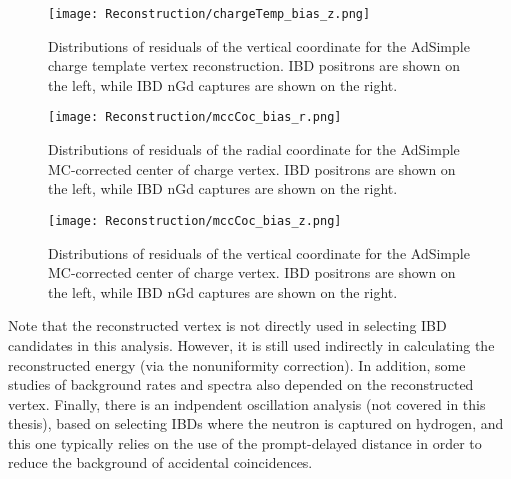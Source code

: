 \documentclass[../thesis.tex]{subfiles}
\begin{document}
\begin{figure}[h]
  \texttt{[image: Reconstruction/chargeTemp\_bias\_z.png]}
  \caption{Distributions of residuals of the vertical coordinate for the AdSimple charge template vertex reconstruction. IBD positrons are shown on the left, while IBD nGd captures are shown on the right.}
  \label{fig:chargeTemp_bias_z}
\end{figure}

\begin{figure}[h]
  \texttt{[image: Reconstruction/mccCoc\_bias\_r.png]}
  \caption{Distributions of residuals of the radial coordinate for the AdSimple MC-corrected center of charge vertex. IBD positrons are shown on the left, while IBD nGd captures are shown on the right.}
  \label{fig:mccCoc_bias_r}
\end{figure}

\begin{figure}[h]
  \texttt{[image: Reconstruction/mccCoc\_bias\_z.png]}
  \caption{Distributions of residuals of the vertical coordinate for the AdSimple MC-corrected center of charge vertex. IBD positrons are shown on the left, while IBD nGd captures are shown on the right.}
  \label{fig:mccCoc_bias_z}
\end{figure}

Note that the reconstructed vertex is not directly used in selecting IBD candidates in this analysis. However, it is still used indirectly in calculating the reconstructed energy (via the nonuniformity correction). In addition, some studies of background rates and spectra also depended on the reconstructed vertex. Finally, there is an indpendent oscillation analysis (not covered in this thesis), based on selecting IBDs where the neutron is captured on hydrogen, and this one typically relies on the use of the prompt-delayed distance in order to reduce the background of accidental coincidences.
\end{document}
